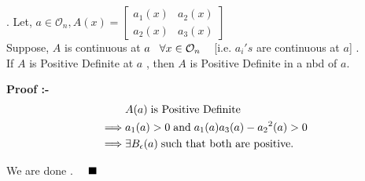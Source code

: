 \documentclass[Analysis-3]{subfiles}
\begin{document}
\begin{LemN}{}
    . Let, $a \in \mathcal{O}_n , A(x) = \begin{bmatrix}
        a_1(x) & a_2(x) \\
        a_2(x) & a_3(x)
    \end{bmatrix}$ \\
    Suppose, $A$ is continuous at $a \hspace{3mm} \forall x \in \mathcal{O}_n \hspace{3mm}$ [i.e. $a_i's $ are continuous at $a$] .\\
    If $A$ is Positive Definite at $a$ , then $A$ is Positive Definite in a nbd of $a$.
\end{LemN}

\textbf{Proof :- } \begin{align*}
    & A(a) \hspace{1mm} \text{is Positive Definite} \\
    \implies & a_1(a) > 0 \hspace{1mm} \text{and} \hspace{1mm} a_1(a) a_3(a) - {a_2}^2(a) > 0 \\
    \implies & \exists B_{\epsilon} (a) \hspace{1mm} \text{such that both are positive}. 
\end{align*} 

We are done . $\quad \blacksquare$
\end{document}
